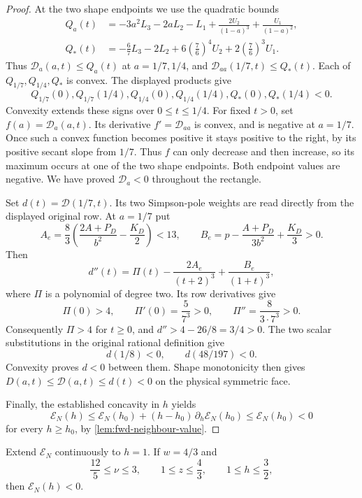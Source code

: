 \begin{proof}
At the two shape endpoints we use the quadratic bounds
\begin{align*}
 Q_a(t)&=-3a^2L_3-2aL_2-L_1
                 +\frac{2U_2}{(1-a)^3}+\frac{U_1}{(1-a)^2},\\
 Q_*(t)&=-\frac67L_3-2L_2
                 +6\left(\frac76\right)^4U_2
                 +2\left(\frac76\right)^3U_1.
\end{align*}
Thus $\mathcal D_a(a,t)\leq Q_a(t)$ at $a=1/7,1/4$, and
$\mathcal D_{aa}(1/7,t)\leq Q_*(t)$.
Each of $Q_{1/7},Q_{1/4},Q_*$ is convex. The displayed products give
\[
 Q_{1/7}(0),Q_{1/7}(1/4),Q_{1/4}(0),Q_{1/4}(1/4),
 Q_*(0),Q_*(1/4)<0.
\]
Convexity extends these signs over $0\leq t\leq1/4$.
For fixed $t>0$, set $f(a)=\mathcal D_a(a,t)$.
Its derivative $f'=\mathcal D_{aa}$ is convex, and is negative at
$a=1/7$. Once such a convex function becomes positive it stays positive
to the right, by its positive secant slope from $1/7$.
Thus $f$ can only decrease and then increase, so its maximum occurs at
one of the two shape endpoints. Both endpoint values are negative.
We have proved $\mathcal D_a<0$ throughout the rectangle.

Set $d(t)=\mathcal D(1/7,t)$. Its two Simpson-pole weights are read
directly from the displayed original row. At $a=1/7$ put
\[
 A_e=\frac83\left(\frac{2A+P_D}{b^2}-\frac{K_D}2\right)<13,
 \qquad
 B_e=p-\frac{A+P_D}{3b^2}+\frac{K_D}3>0.
\]
Then
\[
 d''(t)=\Pi(t)-\frac{2A_e}{(t+2)^3}+\frac{B_e}{(1+t)^3},
\]
where $\Pi$ is a polynomial of degree two. Its row derivatives give
\[
 \Pi(0)>4,\qquad\Pi'(0)=\frac5{7^3}>0,\qquad
 \Pi''=\frac8{3\cdot7^3}>0.
\]
Consequently $\Pi>4$ for $t\geq0$, and
$d''>4-26/8=3/4>0$.
The two scalar substitutions in the original rational definition give
\[
 d(1/8)<0,\qquad d(48/197)<0.
\]
Convexity proves $d<0$ between them. Shape monotonicity then gives
$D(a,t)\leq\mathcal D(a,t)\leq d(t)<0$ on the physical symmetric face.

Finally, the established concavity in $h$ yields
\[
 \mathcal E_N(h)\leq\mathcal E_N(h_0)
                 +(h-h_0)\,\partial_h\mathcal E_N(h_0)
 \leq\mathcal E_N(h_0)<0
\]
for every $h\geq h_0$, by \cref{lem:fwd-neighbour-value}.
\end{proof}

\begin{lemma}\label{lem:fwd-neighbour-asymmetric}
Extend $\mathcal E_N$ continuously to $h=1$. If $w=4/3$ and
\[
 \frac{12}{5}\le\nu\le3,\qquad 1\le z\le\frac43,\qquad
 1\le h\le\frac32,
\]
then $\mathcal E_N(h)<0$.
\end{lemma}

